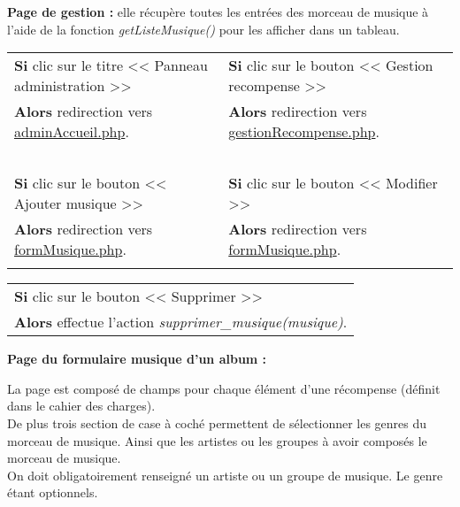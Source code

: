             \begin{paragraphe}
                \textbf{Page de gestion :} elle récupère toutes les entrées des morceau de musique à l'aide de la fonction \emph{getListeMusique()} pour les afficher dans un tableau.
            \end{paragraphe}

            \begin{center}
                \begin{tabular}{l | l}
                    \textbf{Si} clic sur le titre << Panneau administration >> & \textbf{Si} clic sur le bouton << Gestion recompense >> \\
                    \textbf{Alors} redirection vers \underline{adminAccueil.php}. & \textbf{Alors} redirection vers \underline{gestionRecompense.php}. \\ \\

                    \textbf{Si} clic sur le bouton << Ajouter musique >> & \textbf{Si} clic sur le bouton << Modifier >> \\
                    \textbf{Alors} redirection vers \underline{formMusique.php}. & \textbf{Alors} redirection vers \underline{formMusique.php}. \\ \\
                \end{tabular}

                \begin{tabular}{l}
                    \textbf{Si} clic sur le bouton << Supprimer >> \\
                    \textbf{Alors} effectue l'action \emph{supprimer\_musique(musique)}.
                \end{tabular}
            \end{center}
            
        
            \begin{paragraphe}
                \textbf{Page du formulaire musique d'un album :}
            \end{paragraphe}
            
            \begin{paragraphe}
                La page est composé de champs pour chaque élément d'une récompense (définit dans le cahier des charges). \\
                De plus trois section de case à coché permettent de sélectionner les genres du morceau de musique. Ainsi que les artistes ou les groupes à avoir composés le morceau de musique. \\
                On doit obligatoirement renseigné un artiste ou un groupe de musique. Le genre étant optionnels.
            \end{paragraphe}
            
